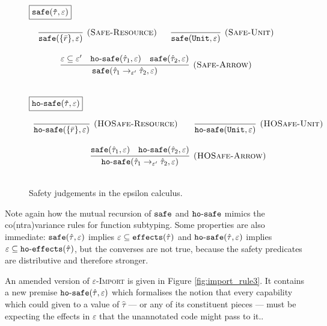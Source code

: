 \begin{figure}[h]

\noindent
$\fbox{$\mathtt{safe(\hat \tau, \varepsilon)}$}$

\[
\begin{array}{c}

\infer[\textsc{(Safe-Resource)}]
	{\kwa{safe}(\{ \bar r \}, \varepsilon)}
	{}
~~~~~
\infer[\textsc{(Safe-Unit)}]
	{\kwa{safe}(\kwa{Unit}, \varepsilon)}
	{} \\[3ex]

\infer[\textsc{(Safe-Arrow)}]
	{\kwa{safe}(\hat \tau_1 \rightarrow_{\varepsilon'} \hat \tau_2, \varepsilon)}
	{\varepsilon \subseteq \varepsilon' & \kwa{ho \hyphen safe}(\hat \tau_1, \varepsilon) & \kwa{safe}(\hat \tau_2, \varepsilon)} \\[3ex]

\end{array}
\]

\noindent
$\fbox{$\mathtt{ho \hbox{-} safe(\hat \tau, \varepsilon)}$}$

\[
\begin{array}{c}

\infer[\textsc{(HOSafe-Resource)}]
	{ \kwa{ho \hyphen safe}( \{ \bar r \}, \varepsilon)} 
	{}
	~~~~~~
\infer[\textsc{(HOSafe-Unit)}]
	{ \kwa{ho \hyphen safe}( \kwa{Unit}, \varepsilon)} 
	{}\\[3ex]

\infer[\textsc{(HOSafe-Arrow)}]
	{ \kwa{ho \hyphen safe}( \hat \tau_1 \rightarrow_{\varepsilon'} \hat \tau_2, \varepsilon ) }
	{ \kwa{safe}(\hat \tau_1, \varepsilon)  & \kwa{ho \hyphen safe}(\hat \tau_2, \varepsilon) }\\[3ex]

\end{array}
\]

\vspace{-7pt}
\caption{Safety judgements in the epsilon calculus.}
\label{fig:safe_defns}
\end{figure}

Note again how the mutual recursion of $\mathtt{safe}$ and $\mathtt{ho \hbox{-} safe}$ mimics the co(ntra)variance rules for function subtyping. Some properties are also immediate: $\mathtt{safe}(\hat \tau, \varepsilon)$ implies $\varepsilon \subseteq \mathtt{effects}(\hat \tau)$ and $\mathtt{ho \hbox{-} safe}(\hat \tau, \varepsilon)$ implies $\varepsilon \subseteq \mathtt{ho \hbox{-} effects}(\hat \tau)$, but the converses are not true, because the safety predicates are distributive and therefore stronger.

An amended version of \textsc{$\varepsilon$-Import} is given in Figure \ref{fig:import_rule3}. It contains a new premise $\mathtt{ho \hbox{-} safe}(\hat \tau, \varepsilon)$ which formalises the notion that every capability which could given to a value of $\hat \tau$ --- or any of its constituent pieces --- must be expecting the effects in $\varepsilon$ that the unannotated code might pass to it..

